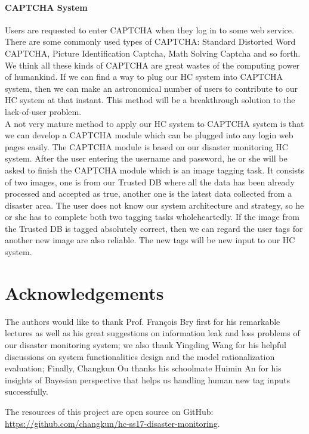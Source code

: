 \paragraph{CAPTCHA System}
Users are requested to enter CAPTCHA when they log in to some web service. 
There are some commonly used types of CAPTCHA: Standard Distorted Word CAPTCHA, Picture Identification Captcha, 
Math Solving Captcha and so forth. We think all these kinds of CAPTCHA are great wastes of 
the computing power of humankind. If we can find a way to plug our HC system into CAPTCHA system, 
then we can make an astronomical number of users to contribute to our HC system at that instant. 
This method will be a breakthrough solution to the lack-of-user problem.\\
A not very mature method to apply our HC system to CAPTCHA system is that we can develop a CAPTCHA module 
which can be plugged into any login web pages easily. The CAPTCHA module is based on our disaster monitoring HC system. 
After the user entering the username and password, he or she will be asked to finish the CAPTCHA module 
which is an image tagging task. It consists of two images, one is from our Trusted DB 
where all the data has been already processed and accepted as true, another one is the latest data 
collected from a disaster area. The user does not know our system architecture and strategy, 
so he or she has to complete both two tagging tasks wholeheartedly. If the image from the Trusted DB is tagged 
absolutely correct, then we can regard the user tags for another new image are also reliable. 
The new tags will be new input to our HC system.

\section*{Acknowledgements}
The authors would like to thank Prof. Fran\c{c}ois Bry first for his remarkable lectures as well as
his great suggestions on information leak and loss problems of our disaster monitoring system;
we also thank Yingding Wang for his helpful discussions on system functionalities design 
and the model rationalization evaluation;
Finally, Changkun Ou thanks his schoolmate Huimin An for his insights of Bayesian perspective that
helps us handling human new tag inputs successfully.

The resources of this project are open source on GitHub: \\
\url{https://github.com/changkun/hc-ss17-disaster-monitoring}.
